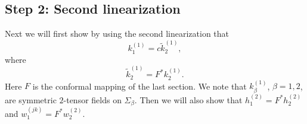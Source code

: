\documentclass[12pt]{amsart}
\def\R{\mathbb R}
\theoremstyle{definition}
\theoremstyle{remark}
\newcommand{\tbl}[1]{\textcolor{blue}{#1}}
\newcommand{\f}[1]{\footnote{\tbl{#1}}}
\begin{document}
% 
% 
% 


\subsection{Step 2: Second linearization} Next we will first show by using the second linearization that
\[
 k_1^{(1)}=c\tilde k_2^{(1)},
\]
where
\[
		 \tilde k_2^{(1)}=F^*k_2^{(1)}.
		\]
Here $F$ is the conformal mapping of the last section. We note that $k_\beta^{(1)}$, $\beta =1,2$, are symmetric $2$-tensor fields on $\Sigma_\beta$. Then we will also show that $h_1^{(2)}=F^*h_2^{(2)}$ and $w_1^{(jk)}=F^*w_2^{(2)}$.
\end{document}
